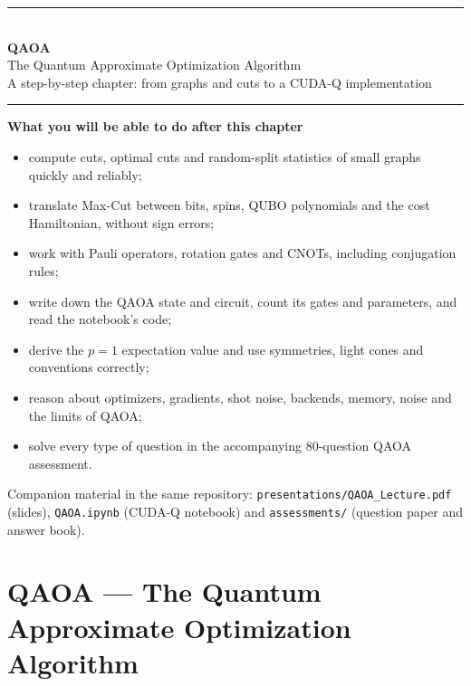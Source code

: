 \documentclass[11pt,a4paper,openany]{book}
\begin{document}
\begin{titlepage}
\centering
{\color{brand}\rule{\linewidth}{1.5pt}}\\[10pt]
{\Huge\bfseries\color{brand} QAOA}\\[8pt]
{\LARGE The Quantum Approximate Optimization Algorithm}\\[6pt]
{\large A step-by-step chapter: from graphs and cuts to a CUDA-Q implementation}\\[6pt]
{\color{brand}\rule{\linewidth}{1.5pt}}
\vspace{18mm}

\begin{minipage}{0.86\linewidth}
\large
\textbf{What you will be able to do after this chapter}
\begin{itemize}[itemsep=3pt]
\item compute cuts, optimal cuts and random-split statistics of small graphs quickly and reliably;
\item translate Max-Cut between bits, spins, QUBO polynomials and the cost Hamiltonian, without sign errors;
\item work with Pauli operators, rotation gates and CNOTs, including conjugation rules;
\item write down the QAOA state and circuit, count its gates and parameters, and read the notebook's code;
\item derive the $p = 1$ expectation value and use symmetries, light cones and conventions correctly;
\item reason about optimizers, gradients, shot noise, backends, memory, noise and the limits of QAOA;
\item solve every type of question in the accompanying 80-question QAOA assessment.
\end{itemize}
\end{minipage}
\vfill
{\small Companion material in the same repository: \texttt{presentations/QAOA\_Lecture.pdf} (slides),
\texttt{QAOA.ipynb} (CUDA-Q notebook) and \texttt{assessments/} (question paper and answer book).}
\end{titlepage}

\tableofcontents
\setcounter{chapter}{0}
\chapter*{QAOA --- The Quantum Approximate Optimization Algorithm}
\end{document}
